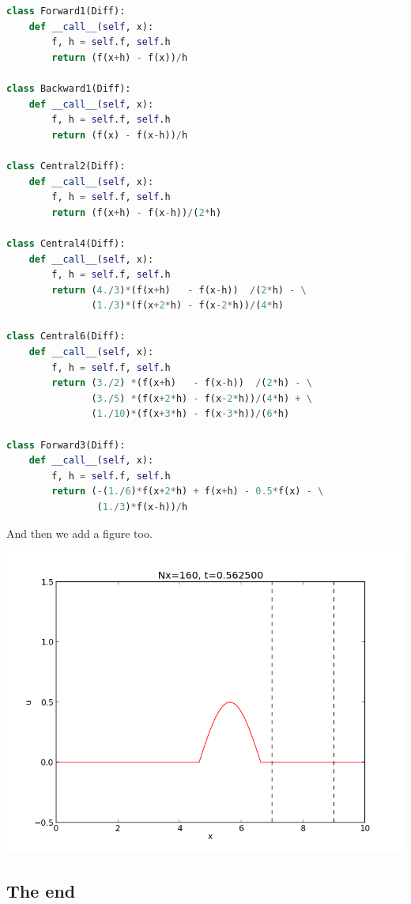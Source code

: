 \documentclass[%
oneside,                 %
final,                   %
10pt]{article}
\newenvironment{noticeshaded}
{\def\FrameCommand{\fboxsep=3mm\colorbox{yellowicon_notice_background}}
 \MakeFramed {\advance\hsize-\width \FrameRestore}}{\endMakeFramed}
\newenvironment{notice_yellowiconadmon}[1][Notice]{
\begin{noticeshaded}
\noindent
\begin{figure}
\vspace{-13pt}
\texttt{[image: latex\_figs/small\_yellow\_notice]}
\end{figure} \textbf{#1}\par
\nobreak\noindent\ignorespaces
}
{
\end{noticeshaded}
}
\begin{document}
\begin{notice_yellowiconadmon}
\begin{lstlisting}[language=python,style=simple,xleftmargin=2mm]
class Forward1(Diff):
    def __call__(self, x):
        f, h = self.f, self.h
        return (f(x+h) - f(x))/h

class Backward1(Diff):
    def __call__(self, x):
        f, h = self.f, self.h
        return (f(x) - f(x-h))/h

class Central2(Diff):
    def __call__(self, x):
        f, h = self.f, self.h
        return (f(x+h) - f(x-h))/(2*h)

class Central4(Diff):
    def __call__(self, x):
        f, h = self.f, self.h
        return (4./3)*(f(x+h)   - f(x-h))  /(2*h) - \
               (1./3)*(f(x+2*h) - f(x-2*h))/(4*h)

class Central6(Diff):
    def __call__(self, x):
        f, h = self.f, self.h
        return (3./2) *(f(x+h)   - f(x-h))  /(2*h) - \
               (3./5) *(f(x+2*h) - f(x-2*h))/(4*h) + \
               (1./10)*(f(x+3*h) - f(x-3*h))/(6*h)

class Forward3(Diff):
    def __call__(self, x):
        f, h = self.f, self.h
        return (-(1./6)*f(x+2*h) + f(x+h) - 0.5*f(x) - \
                (1./3)*f(x-h))/h

\end{lstlisting}

And then we add a figure too.

\vspace{6mm}

\centerline{\includegraphics[width=0.7\linewidth]{testfigs/wave1D.png}}

\vspace{6mm}
\end{notice_yellowiconadmon} %



\subsection{The end}
\end{document}
